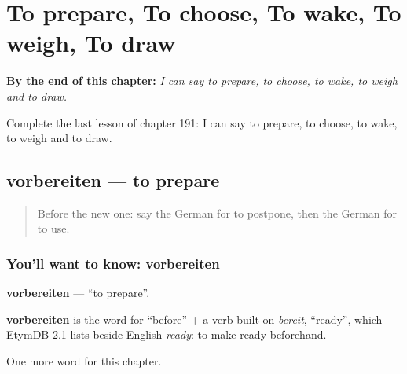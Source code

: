 
\chapter{To prepare, To choose, To wake, To weigh, To draw}
\label{ch:ge-to-prepare-to-choose-to-wake-to-weigh-to-draw}

\begin{chapteropening}
\textbf{By the end of this chapter:} \emph{I can say to prepare, to choose, to wake, to weigh and to draw.}

Complete the last lesson of chapter 191: I can say to prepare, to choose, to wake, to weigh and to draw.
\end{chapteropening}

\section[vorbereiten]{vorbereiten — to prepare}

\label{lesson:GE-C191-vorbereiten}



\begin{quote}
Before the new one: say the German for to postpone, then the German for to use.
\end{quote}

\subsection*{You'll want to know: vorbereiten}
\textbf{vorbereiten} — \textquotedblleft{}to prepare\textquotedblright{}.

\begin{cousinweb}
\textbf{vorbereiten} is the word for \textquotedblleft{}before\textquotedblright{} + a verb built on \emph{bereit}, \textquotedblleft{}ready\textquotedblright{}, which EtymDB 2.1 lists beside English \emph{ready}: to make ready beforehand.
\end{cousinweb}

\begin{grammarlens}[title={What you've built}]
One more word for this chapter.
\end{grammarlens}

